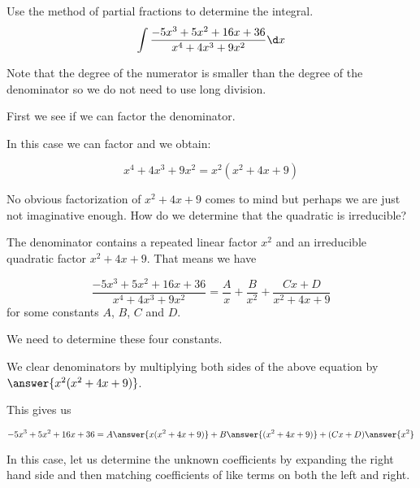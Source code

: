 \documentclass{ximera}
\author{Jim Talamo and Jason Miller}
\begin{document}
\begin{exercise}
Use the method of partial fractions to determine the integral.
\[
\int \frac{-5x^3+5x^2+16x+36}{x^{4}+4x^3+9x^2} \d x
\]

Note that the degree of the numerator is smaller than the degree of the denominator so we do not need 
to use long division. 

First we see if we can factor the denominator. 

In this case we can factor and we obtain:

\[
x^{4}+4x^3+9x^2=x^2(x^2+4x+9)
\]

No obvious factorization of $x^2+4x+9$ comes to mind but perhaps we are just not imaginative enough.  How do we determine that the quadratic is irreducible?

\begin{multipleChoice}
\end{multipleChoice}


  \begin{multipleChoice}
  \end{multipleChoice}

\begin{exercise} 

The denominator contains a repeated linear factor $x^2$ and an irreducible quadratic factor $x^2+4x+9$. 
That means we have

\[
 \frac{-5x^3+5x^2+16x+36}{x^{4}+4x^3+9x^2}= \frac{A}{x} + \frac{B}{x^2} +\frac{Cx+D}{x^2+4x+9}
\]
for some constants $A$, $B$, $C$ and $D$.

We need to determine these four constants. 

We clear denominators by multiplying both sides of the above equation by $\answer{x^2(x^2+4x+9)}$. 

This gives us 

\[
-5x^3+5x^2+16x+36=A\answer{ x(x^2+4x+9)} + B\answer{ (x^2+4x+9)} +  (Cx+D)\answer{x^2}
\]

In this case, let us determine the unknown coefficients by expanding the right hand side and then matching coefficients of like terms on both the left and right. 


\end{exercise}
\end{exercise}
\end{document}
